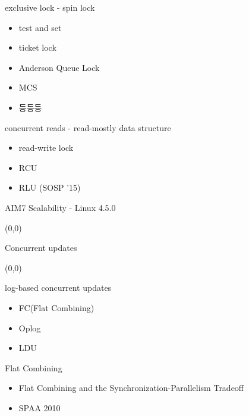 \documentclass[english]{beamer} %
\begin{document}
\begin{frame}{exclusive lock - spin lock}
    \begin{itemize}
    \item test and set
    \item ticket lock
    \item Anderson Queue Lock
    \item MCS
    \item 등등등
    \end{itemize}
\end{frame}

\begin{frame}{concurrent reads - read-mostly data structure}
    \begin{itemize}
    \item read-write lock
    \item RCU
    \item RLU (SOSP '15)
    \end{itemize}
\end{frame}


\begin{frame}{AIM7 Scalability - Linux 4.5.0}
\begin{textblock}{1}(0,0)
\end{textblock}
\end{frame}


\begin{frame}{Concurrent updates}
\begin{textblock}{1}(0,0)
\end{textblock}
\end{frame}

\begin{frame}{log-based concurrent updates}
    \begin{itemize}
    \item FC(Flat Combining)
    \item Oplog
    \item LDU
    \end{itemize}
\end{frame}

\begin{frame}{Flat Combining}
    \begin{itemize}
    \item Flat Combining and the Synchronization-Parallelism Tradeoff
    \item SPAA 2010
    \end{itemize}
\end{frame}
\end{document}
